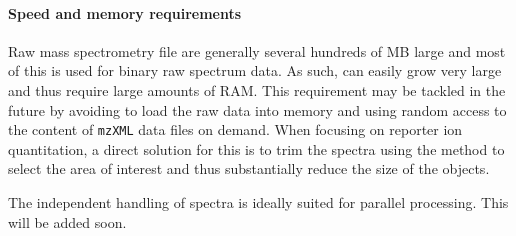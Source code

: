 \paragraph{Speed and memory requirements} Raw mass spectrometry file are generally several 
hundreds of MB large and most of this is used for binary raw spectrum data. As such, 
 can easily grow very large and thus require large amounts of RAM. 
This requirement may be tackled in the future by avoiding to load the raw data into memory
and using random access to the content of \texttt{mzXML} data files on demand. 
When focusing on reporter ion quantitation, a direct solution for this is to trim the 
spectra using the  method to select the area of interest and thus 
substantially reduce the size of the  objects.

The independent handling of spectra is ideally suited for parallel processing. 
This will be added soon.



